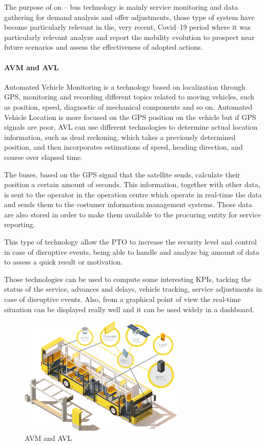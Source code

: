 The purpose of on – bus technology is mainly service monitoring and data gathering for demand analysis and offer adjustments, those type of system have become particularly relevant in the, very recent, Covid–19 period where it was particularly relevant analyze and report the mobility evolution to prospect near future scenarios and assess the effectiveness of adopted actions.


\paragraph{AVM and AVL}
Automated Vehicle Monitoring is a technology based on localization through GPS, monitoring and recording different topics related to moving vehicles, such as position, speed, diagnostic of mechanical components and so on. Automated Vehicle Location is more focused on the GPS position on the vehicle but if GPS signals are poor, AVL can use different technologies to determine actual location information, such as dead reckoning, which takes a previously determined position, and then incorporates estimations of speed, heading direction, and course over elapsed time. 

The buses, based on the GPS signal that the satellite sends, calculate their position a certain amount of seconds. This information, together with other data, is sent to the operator in the operation centre which operate in real-time the data and sends them to the costumer information management systems. Those data are also stored in order to make them available to the procuring entity for service reporting.

This type of technology allow the PTO to increase the security level and control in case of disruptive events, being able to handle and analyze big amount of data to assess a quick result or motivation.

Those technologies can be used to compute some interesting KPIs, tacking the status of the service, advances and delays, vehicle tracking, service adjustments in case of disruptive events. Also, from a graphical point of view the real-time situation can be displayed really well and it can be used widely in a dashboard.
\begin{figure}[H]
    \centering
    \includegraphics[width=0.7\textwidth]{Images/New Technologies/AVMeAVL.jpg}
    \caption{AVM and AVL\cite{avmavlimmage}}
    \label{fig:avmavl}
\end{figure}

